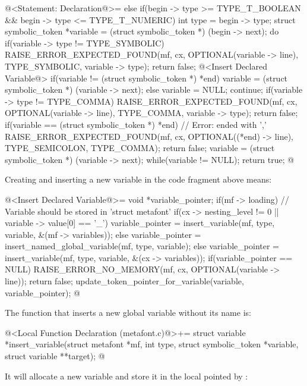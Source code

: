 \iniciocodigo
@<Statement: Declaration@>=
else if(begin -> type >= TYPE_T_BOOLEAN && begin -> type <= TYPE_T_NUMERIC){
  int type = begin -> type;
  struct symbolic_token *variable = (struct symbolic_token *) (begin -> next);
  do{
    if(variable -> type != TYPE_SYMBOLIC){
      RAISE_ERROR_EXPECTED_FOUND(mf, cx, OPTIONAL(variable -> line),
                                 TYPE_SYMBOLIC, variable -> type);
      return false;
    }
    @<Insert Declared Variable@>
    if(variable != (struct symbolic_token *) *end)
      variable = (struct symbolic_token *) (variable -> next);
    else{
      variable = NULL;
      continue;
    }
    if(variable -> type != TYPE_COMMA){
      RAISE_ERROR_EXPECTED_FOUND(mf, cx, OPTIONAL(variable -> line),
                                 TYPE_COMMA, variable -> type);
      return false;
    }
    if(variable == (struct symbolic_token *) *end){ // Error: ended with ','
      RAISE_ERROR_EXPECTED_FOUND(mf, cx, OPTIONAL((*end) -> line),
                                 TYPE_SEMICOLON, TYPE_COMMA);
      return false;
    }
    variable = (struct symbolic_token *) (variable -> next);
  } while(variable != NULL);
  return true;
}
@
\fimcodigo

Creating and inserting a new variable in the code fragment above
means:

\iniciocodigo
@<Insert Declared Variable@>=
{
  void *variable_pointer;
  if(mf -> loading){ // Variable should be stored in 'struct metafont'
    if(cx -> nesting_level != 0 || variable -> value[0] == '_')
      variable_pointer = insert_variable(mf, type, variable,
                                         &(mf -> variables));
    else
      variable_pointer = insert_named_global_variable(mf, type, variable);
  }
  else
    variable_pointer = insert_variable(mf, type, variable, &(cx -> variables));
  if(variable_pointer == NULL){
    RAISE_ERROR_NO_MEMORY(mf, cx, OPTIONAL(variable -> line));
    return false;
  }
  update_token_pointer_for_variable(variable, variable_pointer);
}
@
\fimcodigo

The function that inserts a new global variable without its name is:

\iniciocodigo
@<Local Function Declaration (metafont.c)@>+=
struct variable *insert_variable(struct metafont *mf,
                                 int type,
                                 struct symbolic_token *variable,
                                 struct variable **target);
@
\fimcodigo

It will allocate a new variable and store it in the local pointed
by :

